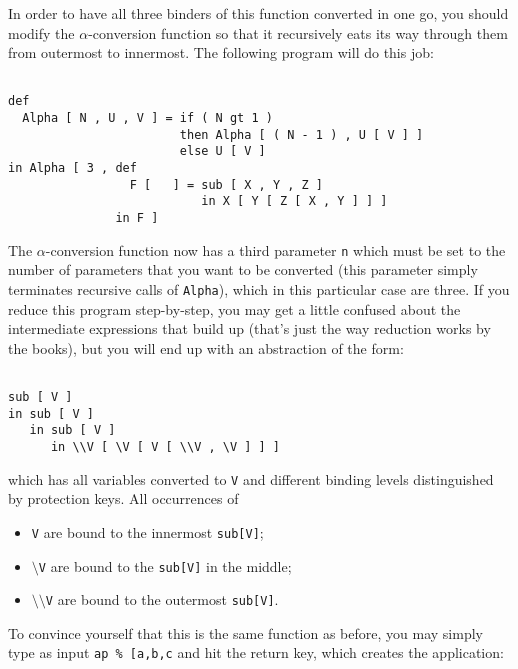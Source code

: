 In order to have all three binders of this function converted in one go,
you should modify the $\alpha$-conversion function so that it recursively
eats its way through them from outermost to innermost.
 The following program will do this job: 
\begin{verbatim}

def 
  Alpha [ N , U , V ] = if ( N gt 1 )
                        then Alpha [ ( N - 1 ) , U [ V ] ]
                        else U [ V ]
in Alpha [ 3 , def 
                 F [   ] = sub [ X , Y , Z ]
                           in X [ Y [ Z [ X , Y ] ] ]
               in F ]

\end{verbatim}
The $\alpha$-conversion function now has a third parameter {\tt n}
which must be set to the number of  parameters that you want to be converted
 (this parameter simply terminates recursive calls of {\tt Alpha}),
which in this particular case are three. If you reduce this program step-by-step, you may get a little confused about the intermediate expressions that
build up (that's just the way reduction works by the books), but you will end up
with an abstraction of the form:
\begin{verbatim}

sub [ V ]
in sub [ V ]
   in sub [ V ]
      in \\V [ \V [ V [ \\V , \V ] ] ]

\end{verbatim}
which has all variables converted to {\tt V} and different binding levels
distinguished by protection keys. All occurrences of
\begin{itemize}
\item {\tt V} are bound to the innermost {\tt sub[V]};
\item {\tt $\setminus$V} are bound to the {\tt sub[V]} in the middle;
\item {\tt $\setminus\setminus$V} are bound to the outermost {\tt sub[V]}.
\end{itemize}
To convince yourself that this is the same function as before, you may simply
type as input {\tt ap \% [a,b,c} and hit the return key, which creates the 
application:
